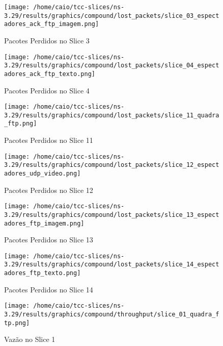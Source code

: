 \documentclass[11pt,twoside]{article}
\begin{document}
	\begin{figure}[H]
		\centering
		\texttt{[image: /home/caio/tcc-slices/ns-3.29/results/graphics/compound/lost\_packets/slice\_03\_espectadores\_ack\_ftp\_imagem.png]}
		\caption{Pacotes Perdidos no Slice 3}
		\label{lost_packets3}
	\end{figure}
	
	\begin{figure}[H]
		\centering
		\texttt{[image: /home/caio/tcc-slices/ns-3.29/results/graphics/compound/lost\_packets/slice\_04\_espectadores\_ack\_ftp\_texto.png]}
		\caption{Pacotes Perdidos no Slice 4}
		\label{lost_packets4}
	\end{figure}
	
	\begin{figure}[H]
		\centering
		\texttt{[image: /home/caio/tcc-slices/ns-3.29/results/graphics/compound/lost\_packets/slice\_11\_quadra\_ftp.png]}
		\caption{Pacotes Perdidos no Slice 11}
		\label{lost_packets11}
	\end{figure}
	
	\begin{figure}[H]
		\centering
		\texttt{[image: /home/caio/tcc-slices/ns-3.29/results/graphics/compound/lost\_packets/slice\_12\_espectadores\_udp\_video.png]}
		\caption{Pacotes Perdidos no Slice 12}
		\label{lost_packets12}
	\end{figure}
	
	\begin{figure}[H]
		\centering
		\texttt{[image: /home/caio/tcc-slices/ns-3.29/results/graphics/compound/lost\_packets/slice\_13\_espectadores\_ftp\_imagem.png]}
		\caption{Pacotes Perdidos no Slice 13}
		\label{lost_packets13}
	\end{figure}
	
	\begin{figure}[H]
		\centering
		\texttt{[image: /home/caio/tcc-slices/ns-3.29/results/graphics/compound/lost\_packets/slice\_14\_espectadores\_ftp\_texto.png]}
		\caption{Pacotes Perdidos no Slice 14}
		\label{lost_packets14}
	\end{figure}
	
	\begin{figure}[H]
		\centering
		\texttt{[image: /home/caio/tcc-slices/ns-3.29/results/graphics/compound/throughput/slice\_01\_quadra\_ftp.png]}
		\caption{Vazão no Slice 1}
		\label{throughput1}
	\end{figure}
	
\end{document}
